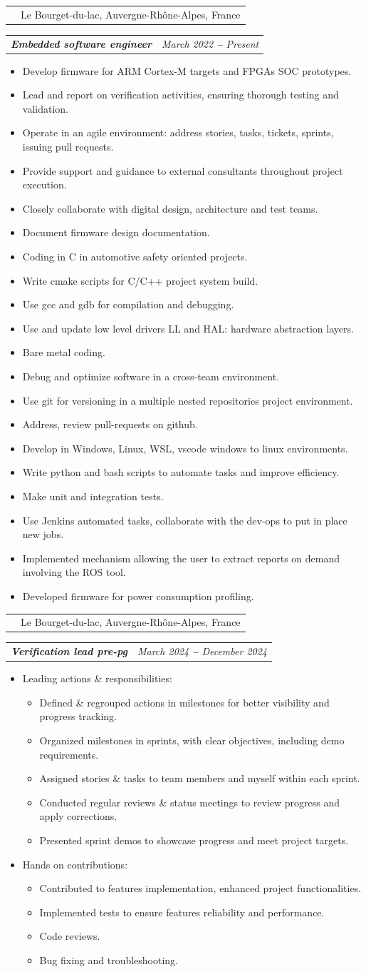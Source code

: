 \documentclass[letterpaper,11pt]{article}
\makeatletter
\def\vspaceAfterBullets{3.5pt} %
\def\bulletIndent{20pt} %
\newcommand{\bulletItem}[1]{
  \item\small{
    {#1}
  }
}
\newcommand{\companyNameAndLocationHeading}[2]{
  \item
    \begin{tabular*}{1.0\textwidth}[b]{l@{\extracolsep{\fill}}r}
      \textbf{#1} & #2
    \end{tabular*}
}
\newcommand{\titleAndDateHeading}[2]{
    \item
    \begin{tabular*}{1.0\textwidth}[b]{l@{\extracolsep{\fill}}r}
      {\bfseries\itshape\small #1} & \itshape\small #2
    \end{tabular*}
}
\newcommand{\outerBulletListStart}{\begin{itemize}[leftmargin=\bulletIndent]}
\newcommand{\outerBulletListEnd}{\end{itemize}\vspace{\vspaceAfterBullets}}
\newcommand{\innerBulletListStart}{\begin{itemize}[leftmargin=\bulletIndent]}
\newcommand{\innerBulletListEnd}{\end{itemize}}
\newcommand{\bref}[2]{\href{#1}{\color{blue}{#2}}}
\makeatother
\begin{document}
\companyNameAndLocationHeading {\bref{https://www.st.com/}{STMicroelectronics}}{Le Bourget-du-lac, Auvergne-Rhône-Alpes, France}
\titleAndDateHeading
{Embedded software engineer}{March 2022 \textbf{--} Present}
\outerBulletListStart
\bulletItem{Develop firmware for ARM Cortex-M targets and FPGAs SOC prototypes.}
\bulletItem{Lead and report on verification activities, ensuring thorough testing and validation.}
\bulletItem{Operate in an agile environment: address stories, tasks, tickets, sprints, issuing pull requests.}
\bulletItem{Provide support and guidance to external consultants throughout project execution.}
\bulletItem{Closely collaborate with digital design, architecture and test teams.}
\bulletItem{Document firmware design documentation.}
\bulletItem{Coding in C in automotive safety oriented projects.}
\bulletItem{Write cmake scripts for C/C++ project system build.}
\bulletItem{Use gcc and gdb for compilation and debugging.}
\bulletItem{Use and update low level drivers LL and HAL: hardware abstraction layers.}
\bulletItem{Bare metal coding.}
\bulletItem{Debug and optimize software in a cross-team environment.}
\bulletItem{Use git for versioning in a multiple nested repositories project environment.}
\bulletItem{Address, review pull-requests on github.}
\bulletItem{Develop in Windows, Linux, WSL, vscode windows to linux environments.}
\bulletItem{Write python and bash scripts to automate tasks and improve efficiency.}
\bulletItem{Make unit and integration tests.}
\bulletItem{Use Jenkins automated tasks, collaborate with the dev-ops to put in place new jobs.}
\bulletItem{Implemented mechanism allowing the user to extract reports on demand involving the ROS tool.}
\bulletItem{Developed firmware for power consumption profiling.}
\outerBulletListEnd
\vspace{1em} %

\companyNameAndLocationHeading {\bref{https://www.st.com/}{STMicroelectronics}}{Le Bourget-du-lac, Auvergne-Rhône-Alpes, France}
\titleAndDateHeading
{Verification lead pre-pg}{March 2024 \textbf{--} December 2024}
\outerBulletListStart
\bulletItem{Leading actions \& responsibilities:}
\innerBulletListStart
\bulletItem{Defined \& regrouped actions in milestones for better visibility and progress tracking.}
\bulletItem{Organized milestones in sprints, with clear objectives, including demo requirements.}
\bulletItem{Assigned stories \& tasks to team members and myself within each sprint.}
\bulletItem{Conducted regular reviews \& status meetings to review progress and apply corrections.}
\bulletItem{Presented sprint demos to showcase progress and meet project targets.}
\innerBulletListEnd
\bulletItem{Hands on contributions:}
\innerBulletListStart
\bulletItem{Contributed to features implementation, enhanced project functionalities.}
\bulletItem{Implemented tests to ensure features reliability and performance.}
\bulletItem{Code reviews.}
\bulletItem{Bug fixing and troubleshooting.}
\innerBulletListEnd
\outerBulletListEnd
\end{document}
